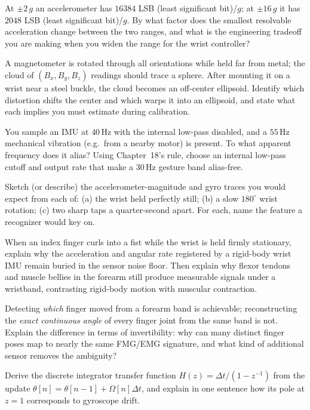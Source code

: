 \begin{exercise}
At $\pm2\,g$ an accelerometer has $16384$ LSB (least significant bit)/$g$; at $\pm16\,g$ it has $2048$
LSB (least significant bit)/$g$. By what factor does the smallest resolvable acceleration change between the
two ranges, and what is the engineering tradeoff you are making when you widen the
range for the wrist controller?
\end{exercise}

\begin{exercise}
A magnetometer is rotated through all orientations while held far from metal; the cloud
of $(B_x,B_y,B_z)$ readings should trace a sphere. After mounting it on a wrist near a
steel buckle, the cloud becomes an off-center ellipsoid. Identify which distortion
shifts the center and which warps it into an ellipsoid, and state what each implies you
must estimate during calibration.
\end{exercise}

\begin{exercise}
You sample an IMU at $40\,\mathrm{Hz}$ with the internal low-pass disabled, and a
$55\,\mathrm{Hz}$ mechanical vibration (e.g.\ from a nearby motor) is present. To what
apparent frequency does it alias? Using Chapter~18's rule, choose an internal low-pass
cutoff and output rate that make a $30\,\mathrm{Hz}$ gesture band alias-free.
\end{exercise}

\begin{exercise}
Sketch (or describe) the accelerometer-magnitude and gyro traces you would expect from
each of: (a) the wrist held perfectly still; (b) a slow $180^\circ$ wrist rotation;
(c) two sharp taps a quarter-second apart. For each, name the feature a recognizer
would key on.
\end{exercise}

\begin{exercise}
When an index finger curls into a fist while the wrist is held firmly stationary,
explain why the acceleration and angular rate registered by a rigid-body wrist IMU
remain buried in the sensor noise floor. Then explain why flexor tendons and muscle
bellies in the forearm still produce measurable signals under a wristband, contrasting
rigid-body motion with muscular contraction.
\end{exercise}

\begin{exercise}
Detecting \emph{which} finger moved from a forearm band is achievable; reconstructing
the \emph{exact continuous angle} of every finger joint from the same band is not.
Explain the difference in terms of invertibility: why can many distinct finger poses
map to nearly the same FMG/EMG signature, and what kind of additional sensor removes the
ambiguity?
\end{exercise}

\begin{exercise}
Derive the discrete integrator transfer function $H(z)=\Delta t/(1-z^{-1})$ from the
update $\theta[n]=\theta[n-1]+\Omega[n]\Delta t$, and explain in one sentence how its
pole at $z=1$ corresponds to gyroscope drift.
\end{exercise}
